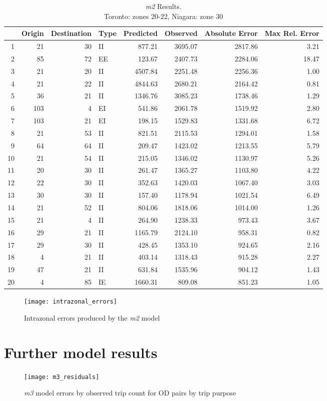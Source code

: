 \begin{table}[ht]
\caption{\textit{m2} Results. \\Toronto: zones 20-22, Niagara: zone 30}
\label{table:m2-error-table}
\centering
\begin{tabular}{rrrlrrrr}
  \toprule
 & Origin & Destination & Type & Predicted & Observed & Absolute Error & Max Rel. Error \\ 
  \midrule
1 & 21 & 30 & II & 877.21 & 3695.07 & 2817.86 & 3.21 \\ 
  2 & 85 & 72 & EE & 123.67 & 2407.73 & 2284.06 & 18.47 \\ 
  3 & 21 & 20 & II & 4507.84 & 2251.48 & 2256.36 & 1.00 \\ 
  4 & 21 & 22 & II & 4844.63 & 2680.21 & 2164.42 & 0.81 \\ 
  5 & 36 & 21 & II & 1346.76 & 3085.23 & 1738.46 & 1.29 \\ 
  6 & 103 & 4 & EI & 541.86 & 2061.78 & 1519.92 & 2.80 \\ 
  7 & 103 & 21 & EI & 198.15 & 1529.83 & 1331.68 & 6.72 \\ 
  8 & 21 & 53 & II & 821.51 & 2115.53 & 1294.01 & 1.58 \\ 
  9 & 64 & 64 & II & 209.47 & 1423.02 & 1213.55 & 5.79 \\ 
  10 & 21 & 54 & II & 215.05 & 1346.02 & 1130.97 & 5.26 \\ 
  11 & 20 & 30 & II & 261.47 & 1365.27 & 1103.80 & 4.22 \\ 
  12 & 22 & 30 & II & 352.63 & 1420.03 & 1067.40 & 3.03 \\ 
  13 & 30 & 30 & II & 157.40 & 1178.94 & 1021.54 & 6.49 \\ 
  14 & 21 & 52 & II & 804.06 & 1818.06 & 1014.00 & 1.26 \\ 
  15 & 21 & 4 & II & 264.90 & 1238.33 & 973.43 & 3.67 \\ 
  16 & 29 & 21 & II & 1165.79 & 2124.10 & 958.31 & 0.82 \\ 
  17 & 29 & 30 & II & 428.45 & 1353.10 & 924.65 & 2.16 \\ 
  18 & 4 & 21 & II & 403.14 & 1318.43 & 915.28 & 2.27 \\ 
  19 & 47 & 21 & II & 631.84 & 1535.96 & 904.12 & 1.43 \\ 
  20 & 4 & 85 & IE & 1660.31 & 809.08 & 851.23 & 1.05 \\ 
   \bottomrule
\end{tabular}
\end{table}

\begin{figure}[H]
\centering
\texttt{[image: intrazonal\_errors]}
\caption{Intrazonal errors produced by the \textit{m2} model}
\label{fig:m2-intrazonal}
\end{figure}

\chapter{Further model results}

\begin{figure}[H]
\centering
\texttt{[image: m3\_residuals]}
\caption{\textit{m3} model errors by observed trip count for OD pairs by trip purpose}
\label{fig:m3_residuals}
\end{figure}



